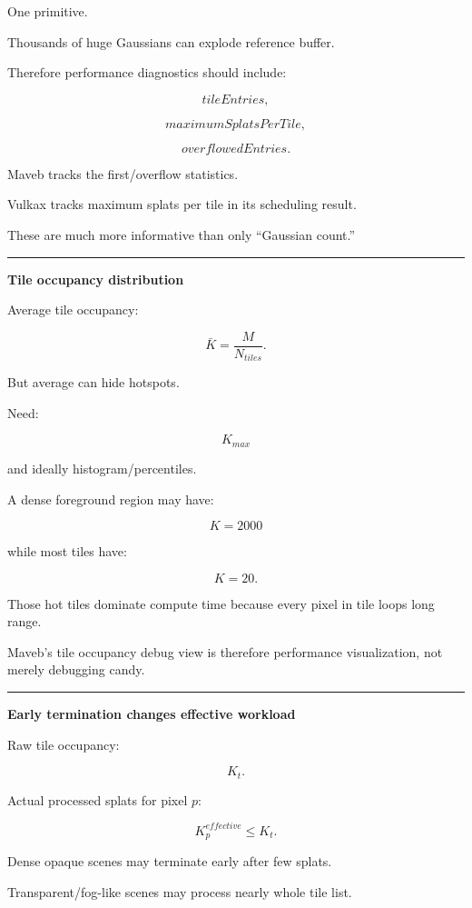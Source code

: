 One primitive.

Thousands of huge Gaussians can explode reference buffer.

Therefore performance diagnostics should include:

\[
tileEntries,
\]

\[
maximumSplatsPerTile,
\]

\[
overflowedEntries.
\]

Maveb tracks the first/overflow statistics.

Vulkax tracks maximum splats per tile in its scheduling result.

These are much more informative than only ``Gaussian count.''

\begin{center}\rule{0.5\linewidth}{0.5pt}\end{center}

\textbf{Tile occupancy distribution}

Average tile occupancy:

\[
\bar K
=
\frac{
M
}{
N_{tiles}
}.
\]

But average can hide hotspots.

Need:

\[
K_{max}
\]

and ideally histogram/percentiles.

A dense foreground region may have:

\[
K=2000
\]

while most tiles have:

\[
K=20.
\]

Those hot tiles dominate compute time because every pixel in tile loops long range.

Maveb's tile occupancy debug view is therefore performance visualization, not merely debugging candy.

\begin{center}\rule{0.5\linewidth}{0.5pt}\end{center}

\textbf{Early termination changes effective workload}

Raw tile occupancy:

\[
K_t.
\]

Actual processed splats for pixel \(p\):

\[
K_p^{effective}
\le
K_t.
\]

Dense opaque scenes may terminate early after few splats.

Transparent/fog-like scenes may process nearly whole tile list.

